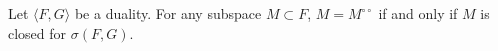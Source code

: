 Let $\langle F, G \rangle$ be a duality. For any subspace $M \subset F$, $M = M^{\circ\circ}$ if and only if $M$ is closed for $\sigma(F, G)$.
